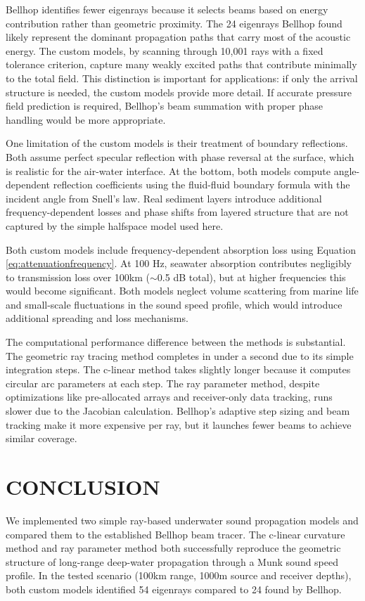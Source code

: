 \documentclass[fleqn]{jaes}
\begin{document}
Bellhop identifies fewer eigenrays because it selects beams based on energy contribution rather than geometric proximity. The 24 eigenrays Bellhop found likely represent the dominant propagation paths that carry most of the acoustic energy. The custom models, by scanning through 10,001 rays with a fixed tolerance criterion, capture many weakly excited paths that contribute minimally to the total field. This distinction is important for applications: if only the arrival structure is needed, the custom models provide more detail. If accurate pressure field prediction is required, Bellhop's beam summation with proper phase handling would be more appropriate.

One limitation of the custom models is their treatment of boundary reflections. Both assume perfect specular reflection with phase reversal at the surface, which is realistic for the air-water interface. At the bottom, both models compute angle-dependent reflection coefficients using the fluid-fluid boundary formula with the incident angle from Snell's law. Real sediment layers introduce additional frequency-dependent losses and phase shifts from layered structure that are not captured by the simple halfspace model used here.

Both custom models include frequency-dependent absorption loss using Equation \ref{eq:attenuationfrequency}. At 100 Hz, seawater absorption contributes negligibly to transmission loss over 100km ($\sim$0.5 dB total), but at higher frequencies this would become significant. Both models neglect volume scattering from marine life and small-scale fluctuations in the sound speed profile, which would introduce additional spreading and loss mechanisms.

The computational performance difference between the methods is substantial. The geometric ray tracing method completes in under a second due to its simple integration steps. The c-linear method takes slightly longer because it computes circular arc parameters at each step. The ray parameter method, despite optimizations like pre-allocated arrays and receiver-only data tracking, runs slower due to the Jacobian calculation. Bellhop's adaptive step sizing and beam tracking make it more expensive per ray, but it launches fewer beams to achieve similar coverage.

\section{CONCLUSION}

We implemented two simple ray-based underwater sound propagation models and compared them to the established Bellhop beam tracer. The c-linear curvature method and ray parameter method both successfully reproduce the geometric structure of long-range deep-water propagation through a Munk sound speed profile. In the tested scenario (100km range, 1000m source and receiver depths), both custom models identified 54 eigenrays compared to 24 found by Bellhop.
\end{document}
